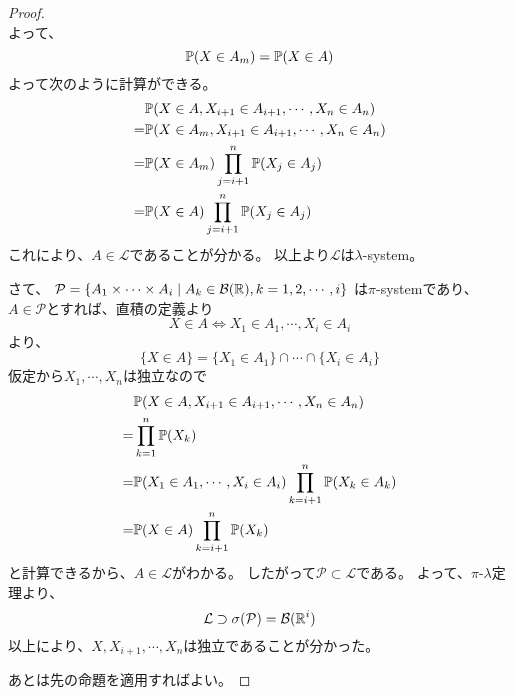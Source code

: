 \begin{proof}
\[        \]
        よって、
        \[
          {\mathbb{P}}(X \in A_m) = {\mathbb{P}}(X \in A)
        \]
        よって次のように計算ができる。
        \begin{align*}
          &{\mathbb{P}}(X \in A, X_{i+1} \in A_{i+1}, \cdots, X_n \in A_n) \\
          =&{\mathbb{P}}(X \in A_m, X_{i+1} \in A_{i+1}, \cdots, X_n \in A_n) \\
          =&{\mathbb{P}}(X \in A_m)\prod_{j = i+1}^n {\mathbb{P}}(X_j \in A_j) \\
          =&{\mathbb{P}}(X \in A)\prod_{j = i+1}^n {\mathbb{P}}(X_j \in A_j)
        \end{align*}
        これにより、$A \in \mathcal{L}$であることが分かる。
        以上より$\mathcal{L}$は$\lambda$-system。

        さて、
        $\mathcal{P} = \{A_1 \times \cdots \times A_i \mid A_k \in {\mathcal{B}}({\mathbb{R}}) , k = 1, 2, \cdots, i\}$
        は$\pi$-systemであり、$A \in \mathcal{P}$とすれば、直積の定義より
        \[
          X \in A \Leftrightarrow X_1 \in A_1, \cdots, X_i \in A_i
        \]
        より、
        \[
          \{X \in A\} = \{X_1 \in A_1\} \cap \cdots \cap \{X_i \in A_i\}
        \]
        仮定から$X_1 ,\cdots , X_n$は独立なので
        \begin{align*}
            &{\mathbb{P}}(X \in A ,X_{i+1} \in A_{i+1}, \cdots, X_n \in A_n) \\
            =& \prod_{k=1}^n{\mathbb{P}}(X_k) \\
            =& {\mathbb{P}}(X_1 \in A_1, \cdots, X_i \in A_i)\prod_{k=i+1}^n{\mathbb{P}}(X_k \in A_k) \\
            =& {\mathbb{P}}(X \in A)\prod_{k=i+1}^n{\mathbb{P}}(X_k)
        \end{align*}
        と計算できるから、$A \in \mathcal{L}$がわかる。
        したがって$\mathcal{P} \subset \mathcal{L}$である。
        よって、$\pi$-$\lambda$定理より、
        \[
          \mathcal{L} \supset \sigma(\mathcal{P}) = {\mathcal{B}}({\mathbb{R}}^i)
        \]
        以上により、$X, X_{i+1}, \cdots, X_n$は独立であることが分かった。

        あとは先の命題を適用すればよい。
      \end{proof}

